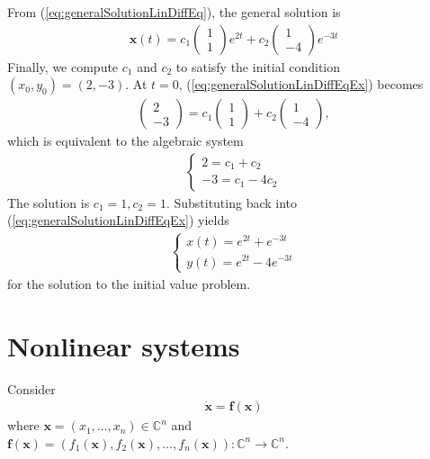 From (\ref{eq:generalSolutionLinDiffEq}), the general solution is
\begin{eqnarray}
	\label{eq:generalSolutionLinDiffEqEx}
	\mathbf{x}(t)=c_1
	\begin{pmatrix}
		1
		\\
		1
	\end{pmatrix}
	e^{2t}
	+
	c_2
	\begin{pmatrix}
		1
		\\
		-4
	\end{pmatrix}
	e^{-3t}
\end{eqnarray}
Finally, we compute $c_1$ and $c_2$ to satisfy the initial condition $(x_0,y_0)=(2,-3)$. At $t=0$, (\ref{eq:generalSolutionLinDiffEqEx}) becomes
\begin{eqnarray*}
	\begin{pmatrix}
		2
		\\
		-3
	\end{pmatrix}
	=
	c_1
	\begin{pmatrix}
		1
		\\
		1
	\end{pmatrix}
	+
	c_2
	\begin{pmatrix}
		1\\-4
	\end{pmatrix},
\end{eqnarray*}
which is equivalent to the algebraic system
\begin{eqnarray*}
	\begin{cases}
		2 = c_1+c_2
		\\
		-3=c_1-4c_2
	\end{cases}
\end{eqnarray*}
The solution is $c_1=1, c_2=1$. Substituting back into (\ref{eq:generalSolutionLinDiffEqEx}) yields
\begin{eqnarray*}
	\begin{cases}
		x(t)=e^{2t}+e^{-3t}
		\\
		y(t)=e^{2t}-4e^{-3t}
	\end{cases}
\end{eqnarray*}
for the solution to the initial value problem.

\section{Nonlinear systems}
	Consider
	\begin{eqnarray}
		\mathbf{\dot x}=\mathbf{f(x)}
	\end{eqnarray}
	where $\mathbf{x}=(x_1,\dots,x_n)\in\mathbb C^n$ and $\mathbf{f(x)}=(f_1(\mathbf{x}), f_2(\mathbf{x}),\dots,f_n(\mathbf{x})): \mathbb C^n\rightarrow\mathbb C^n$.
\\

